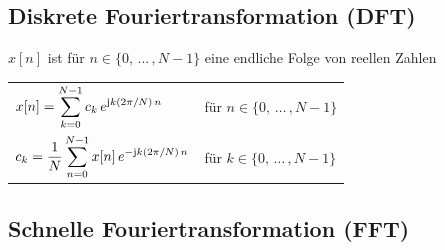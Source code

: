 \subsection{Diskrete Fouriertransformation (DFT)}

$x[n]$ ist für $n \in \{ 0, \, ... \, , N-1 \} $ eine endliche Folge von reellen Zahlen

\vspace{0.2cm}

\renewcommand{\arraystretch}{2.8}
\begin{tabular}{ll}
    $\displaystyle x[n] = \sum \limits_{k = 0}^{N-1} c_k \, e^{\mathrm{j} k (2 \pi / N) \, n}$                 & für $n \in \{ 0, \, \ldots \, , N-1 \}$ \\
    $\displaystyle c_k = \frac{1}{N} \sum \limits_{n = 0}^{N-1} x[n] \, e^{- \mathrm{j} k (2 \pi / N) \, n}  $ & für $k \in \{ 0, \, \ldots \, , N-1 \}$ 
\end{tabular}				
\renewcommand{\arraystretch}{1}







\subsection{Schnelle Fouriertransformation (FFT)}

